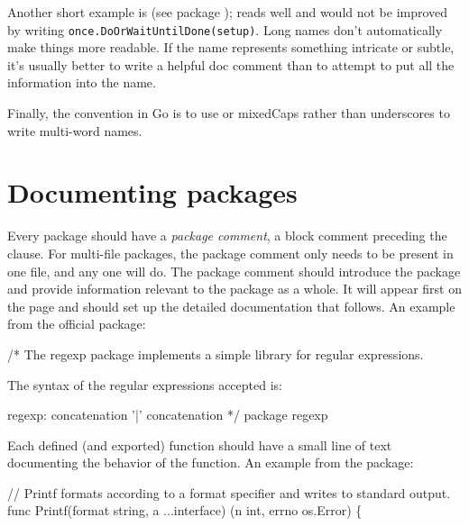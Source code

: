 Another short example is  (see package );  reads well and would
not be improved by writing \lstinline{once.DoOrWaitUntilDone(setup)}. Long names
don't automatically make things more readable. If the name represents
something intricate or subtle, it's usually better to write a helpful
doc comment than to attempt to put all the information into the name.

Finally, the convention in Go is to use  or mixedCaps rather
than underscores to write multi-word names.


\section{Documenting packages}
Every package should have a \emph{package comment}, a block comment preceding the
 clause. For multi-file packages, the package comment only needs to be
present in one file, and any one will do. The package comment should introduce
the package and provide information relevant to the package as a whole. It will
appear first on the  page and should set up the detailed documentation
that follows. An example from the official  package:
\begin{display}
/*
    The regexp package implements a simple library for
    regular expressions.

    The syntax of the regular expressions accepted is:

    regexp:
        concatenation { '|' concatenation }
*/
package regexp
\end{display}

Each defined (and exported) function should have a small line of text
documenting the behavior of the function. An example from the 
package:
\begin{display}
// Printf formats according to a format specifier and writes to standard output.
func Printf(format string, a ...interface{}) (n int, errno os.Error) \{
\end{display}

